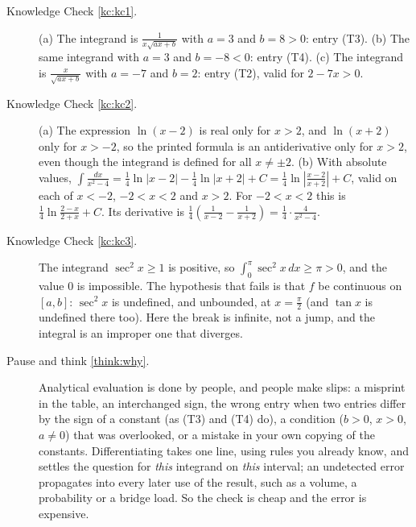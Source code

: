 \documentclass[11pt]{article}
\begin{document}
\begin{description}
  \item[Knowledge Check \ref{kc:kc1}.] (a) The integrand is $\frac1{x\sqrt{ax+b}}$ with $a=3$ and $b=8>0$: entry (T3). (b) The same integrand with $a=3$ and $b=-8<0$: entry (T4). (c) The integrand is $\frac x{\sqrt{ax+b}}$ with $a=-7$ and $b=2$: entry (T2), valid for $2-7x>0$.

  \item[Knowledge Check \ref{kc:kc2}.] (a) The expression $\ln(x-2)$ is real only for $x>2$, and $\ln(x+2)$ only for $x>-2$, so the printed formula is an antiderivative only for $x>2$, even though the integrand is defined for all $x\ne\pm2$. (b) With absolute values, $\int\frac{dx}{x^2-4}=\frac14\ln\lvert x-2\rvert-\frac14\ln\lvert x+2\rvert+C=\frac14\ln\left\lvert\frac{x-2}{x+2}\right\rvert+C$, valid on each of $x<-2$, $-2<x<2$ and $x>2$. For $-2<x<2$ this is $\frac14\ln\frac{2-x}{2+x}+C$. Its derivative is $\frac14\left(\frac1{x-2}-\frac1{x+2}\right)=\frac14\cdot\frac4{x^2-4}$.

  \item[Knowledge Check \ref{kc:kc3}.] The integrand $\sec^2x\ge1$ is positive, so $\int_0^\pi\sec^2x\,dx\ge\pi>0$, and the value $0$ is impossible. The hypothesis that fails is that $f$ be continuous on $[a,b]$: $\sec^2x$ is undefined, and unbounded, at $x=\frac\pi2$ (and $\tan x$ is undefined there too). Here the break is infinite, not a jump, and the integral is an improper one that diverges.

  \item[Pause and think \ref{think:why}.] Analytical evaluation is done by people, and people make slips: a misprint in the table, an interchanged sign, the wrong entry when two entries differ by the sign of a constant (as (T3) and (T4) do), a condition ($b>0$, $x>0$, $a\ne0$) that was overlooked, or a mistake in your own copying of the constants. Differentiating takes one line, using rules you already know, and settles the question for \emph{this} integrand on \emph{this} interval; an undetected error propagates into every later use of the result, such as a volume, a probability or a bridge load. So the check is cheap and the error is expensive.


\end{description}
\end{document}
